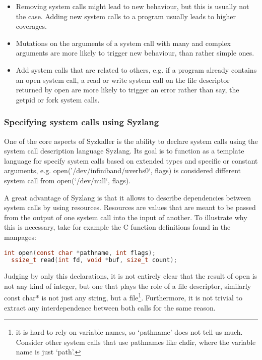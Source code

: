 \begin{itemize}
  \item Removing system calls might lead to new behaviour, but this is usually not the case. Adding new system calls to a program usually leads to higher coverages.
  \item Mutations on the arguments of a  system call with many and complex arguments are more likely to trigger new behaviour, than rather simple ones.
  \item Add system calls that are related to others, e.g. if a program already contains an open system call, a read or write system call on the file descriptor returned by open are more likely to trigger an error rather than say, the getpid or fork system calls.
\end{itemize}

\subsubsection{Specifying system calls using Syzlang}


One of the core aspects of Syzkaller is the ability to declare system calls using
the system call description language Syzlang. Its goal is to function as a template
language for specify system calls based on extended types and specific or constant arguments,
e.g. open('/dev/infiniband/uverbs0`, flags) is considered different system call from open(`/dev/null`, flags).

A great advantage of Syzlang is
that it allows to describe dependencies between system calls by using resources.
Resources are values that are meant to be passed from the output of one system call
into the input of another.
To illustrate why this is necessary, take for example the C function definitions found in the manpages:

\begin{lstlisting}[caption={Manpage C definitions for open and read}, language=c]
  int open(const char *pathname, int flags);
  ssize_t read(int fd, void *buf, size_t count);
\end{lstlisting}

Judging by only this declarations, it is not entirely clear that the result of open
is not any kind of integer, but one that plays the role of a file descriptor, similarly const char* is not
just any string, but a file\footnote{it is hard to rely on variable names, so `pathname' does not tell us much. Consider other system calls that use pathnames like chdir, where the variable name is just `path'.}. Furthermore,
it is not trivial to extract any interdependence between both calls for the same reason.

